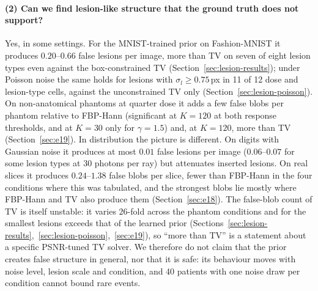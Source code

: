 \paragraph{(2) Can we find lesion-like structure that the ground truth does not support?}
Yes, in some settings. For the MNIST-trained prior on Fashion-MNIST it produces $0.20$--$0.66$ false lesions per image, more than TV on seven of eight lesion types even against the box-constrained TV (Section~\ref{sec:lesion-results}); under Poisson noise the same holds for lesions with $\sigma_l\ge0.75$\,px in 11 of 12 dose and lesion-type cells, against the unconstrained TV only (Section~\ref{sec:lesion-poisson}). On non-anatomical phantoms at quarter dose it adds a few false blobs per phantom relative to FBP-Hann (significant at $K=120$ at both response thresholds, and at $K=30$ only for $\gamma=1.5$) and, at $K=120$, more than TV (Section~\ref{sec:e19}).
In distribution the picture is different. On digits with Gaussian noise it produces at most $0.01$ false lesions per image ($0.06$--$0.07$ for some lesion types at $30$ photons per ray) but attenuates inserted lesions. On real slices it produces $0.24$--$1.38$ false blobs per slice, fewer than FBP-Hann in the four conditions where this was tabulated, and the strongest blobs lie mostly where FBP-Hann and TV also produce them (Section~\ref{sec:e18}).
The false-blob count of TV is itself unstable: it varies $26$-fold across the phantom conditions and for the smallest lesions exceeds that of the learned prior (Sections~\ref{sec:lesion-results},~\ref{sec:lesion-poisson},~\ref{sec:e19}), so ``more than TV'' is a statement about a specific PSNR-tuned TV solver.
We therefore do not claim that the prior creates false structure in general, nor that it is safe: its behaviour moves with noise level, lesion scale and condition, and 40 patients with one noise draw per condition cannot bound rare events.

